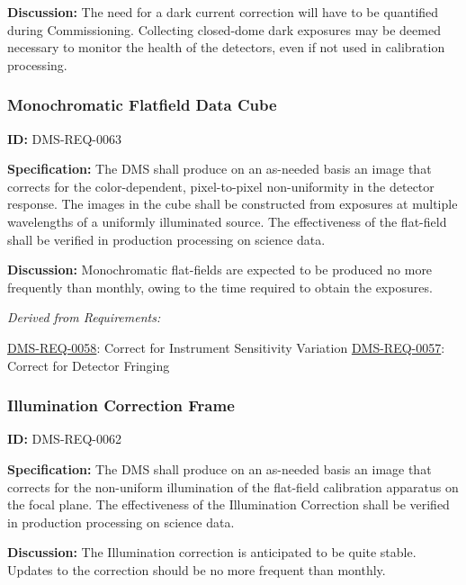 \documentclass[SE,toc,lsstdraft]{lsstdoc}
\begin{document}
\textbf{Discussion: }The need for a dark current correction will have to be quantified during Commissioning. Collecting closed-dome dark exposures may be deemed necessary to monitor the health of the detectors, even if not used in calibration processing.




\subsubsection{Monochromatic Flatfield Data Cube}

\label{DMS-REQ-0063}
\textbf{ID:} DMS-REQ-0063

\textbf{Specification:} The DMS shall produce on an as-needed basis an image that corrects for the color-dependent, pixel-to-pixel non-uniformity in the detector response. The images in the cube shall be constructed from exposures at multiple wavelengths of a uniformly illuminated source. The effectiveness of the flat-field shall be verified in production processing on science data.

\textbf{Discussion:} Monochromatic flat-fields are expected to be produced no more frequently than monthly, owing to the time required to obtain the exposures.




\emph{Derived from Requirements:}

\hyperref[DMS-REQ-0058]{DMS-REQ-0058}:
Correct for Instrument Sensitivity Variation \newline
\hyperref[DMS-REQ-0057]{DMS-REQ-0057}:
Correct for Detector Fringing \newline


\subsubsection{Illumination Correction Frame}

\label{DMS-REQ-0062}
\textbf{ID:} DMS-REQ-0062

\textbf{Specification:} The DMS shall produce on an as-needed basis an image that corrects for the non-uniform illumination of the flat-field calibration apparatus on the focal plane. The effectiveness of the Illumination Correction shall be verified in production processing on science data.

\textbf{Discussion:} The Illumination correction is anticipated to be quite stable. Updates to the correction should be no more frequent than monthly.
\end{document}
